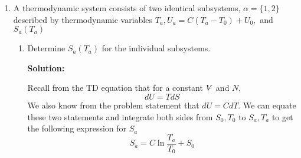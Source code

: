 \documentclass[10pt]{article}
\newenvironment{Solution}
    {\textbf{Solution:}
    
    \vspace{5mm}
    \begin{tcolorbox}
    }
    {
    \end{tcolorbox}
    \vspace{5mm}
    }
\newcommand{\vol}{{\ooalign{\hfil$V$\hfil\cr\kern0.08em--\hfil\cr}}}
\begin{document}
\begin{enumerate}
\begin{enumerate}
    
    \item (T) (F) The cycle acts as an engine, transferring heat from the hot bath to the cold bath and doing positive net work on the outside world.
    
    
    \item (T) (F) The work done per cycle has magnitude $\left|W\right| = P_0 \vol_0 \left|4 \log{4} - 3\right|$.
    
    
    \item (T) (F) The heat transferred into the cold bath, $Q_c$ , has magnitude $\left|Q_c \right| = \left(9/2\right)P_0 \vol_0$.
    
    
    \item (T) (F) The heat transferred from the hot bath, $Q_h$ , plus the net work $W$ done by the piston onto the gas, equals the heat $Q_c$ transferred into the cold bath.
    
    
\end{enumerate}

\begin{Solution}


\end{Solution}

\item A thermodynamic system consists of two identical subsystems, $\alpha=\{1,2\}$ described by thermodynamic variables $T_{a}, U_{a}=C\left(T_{a}-T_{0}\right)+U_{0},$ and $S_{a}\left(T_{a}\right)$

\begin{enumerate}

\item Determine $S_{a}\left(T_{a}\right)$ for the individual subsystems.

\begin{Solution}
Recall from the TD equation that for a constant $\vol$ and $N$,
\begin{equation}
    dU = T dS
\end{equation}
We also know from the problem statement that $dU = CdT$. We can equate these two statements and integrate both sides from $S_0, T_0$ to $S_a, T_a$ to get the following expression for $S_a$
\begin{equation}
\boxed{
    S_a = C \ln{\frac{T_a}{T_0}} + S_0
    }
\end{equation}


\end{Solution}
\end{enumerate}
\end{enumerate}
\end{document}
